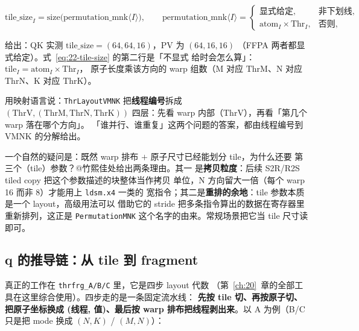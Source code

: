 \begin{equation}
  \mathrm{tile\_size}_I = \mathrm{size}\bigl(\mathrm{permutation\_mnk}\langle I\rangle\bigr),
  \qquad
  \mathrm{permutation\_mnk}\langle I\rangle =
  \begin{cases}
    \text{显式给定}, & \text{非下划线},\\[2pt]
    \mathrm{atom}_I \times \mathrm{Thr}_I, & \text{否则},
  \end{cases}
  \label{eq:22-tile-size}
\end{equation}

给出：QK 实测 $\mathrm{tile\_size} = (64,64,16)$，PV 为 $(64,16,16)$
（FFPA 两者都显式给定）。式~\eqref{eq:22-tile-size} 的第二行是「不显式
给时会怎么算」：$\mathrm{tile}_I = \mathrm{atom}_I \times \mathrm{Thr}_I$，
原子长度乘该方向的 warp 组数（M 对应
$\mathrm{ThrM}$、N 对应 $\mathrm{ThrN}$、K 对应 $\mathrm{ThrK}$）。

用映射语言说：\texttt{Thr\allowbreak{}Layout\allowbreak{}VMNK} 把\textbf{线程编号}拆成
$(\mathrm{ThrV},(\mathrm{ThrM},\mathrm{ThrN},\mathrm{ThrK}))$ 四层：先看
warp 内部（$\mathrm{ThrV}$），再看「第几个 warp 落在哪个方向」。
「谁并行、谁重复」这两个问题的答案，都由线程编号到 VMNK 的分解给出。

一个自然的疑问是：既然 warp 排布 $+$ 原子尺寸已经能划分 tile，为什么还要
第三个（tile）参数？@竹熙佳处给出两条理由。其一
是\textbf{拷贝粒度}：后续 S2R/R2S tiled copy 把这个参数描述的块整体当作拷贝
单位，N 方向留大一倍（每个 warp 16 而非 8）才能用上 \texttt{ldsm.x4} 一类的
宽指令；其二是\textbf{重排的余地}：tile 参数本质是一个 layout，高级用法可以
借助它的 stride 把多条指令算出的数据在寄存器里重新排列，这正是
\texttt{Permutation\allowbreak{}MNK} 这个名字的由来。常规场景把它当 tile 尺寸读即可。

\subsection{q 的推导链：从 tile 到 fragment}

真正的工作在 \texttt{thrfrg\_\allowbreak{}A/\allowbreak{}B/\allowbreak{}C} 里，它是四步 layout 代数
（第~\ref{ch:20}~章的全部工具在这里综合使用）。四步走的是一条固定流水线：
\textbf{先按 tile 切、再按原子切、把原子坐标换成 (线程, 值)、最后按 warp
排布把线程剥出来}。以 A 为例（B/C 只是把 mode 换成 $(N,K)$ / $(M,N)$）：

